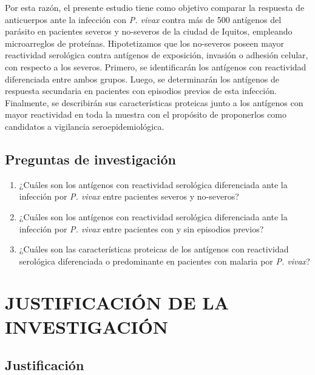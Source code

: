 \documentclass[
  a4paper]{article}
\begin{document}
Por esta razón, el presente estudio tiene como objetivo comparar la
respuesta de anticuerpos ante la infección con \emph{P. vivax} contra
más de 500 antígenos del parásito en pacientes severos y no-severos de
la ciudad de Iquitos, empleando microarreglos de proteínas.
Hipotetizamos que los no-severos poseen mayor reactividad serológica
contra antígenos de exposición, invasión o adhesión celular, con
respecto a los severos. Primero, se identificarán los antígenos con
reactividad diferenciada entre ambos grupos. Luego, se determinarán los
antígenos de respuesta secundaria en pacientes con episodios previos de
esta infección. Finalmente, se describirán sus características proteicas
junto a los antígenos con mayor reactividad en toda la muestra con el
propósito de proponerlos como candidatos a vigilancia
seroepidemiológica.

\hypertarget{preguntas-de-investigaciuxf3n}{%
\subsection{Preguntas de
investigación}\label{preguntas-de-investigaciuxf3n}}

\begin{enumerate}
\def\labelenumi{\arabic{enumi}.}
\item
  ¿Cuáles son los antígenos con reactividad serológica diferenciada ante
  la infección por \emph{P. vivax} entre pacientes severos y no-severos?
\item
  ¿Cuáles son los antígenos con reactividad serológica diferenciada ante
  la infección por \emph{P. vivax} entre pacientes con y sin episodios
  previos?
\item
  ¿Cuáles son las características proteicas de los antígenos con
  reactividad serológica diferenciada o predominante en pacientes con
  malaria por \emph{P. vivax}?
\end{enumerate}

\hypertarget{justificaciuxf3n-de-la-investigaciuxf3n}{%
\section{JUSTIFICACIÓN DE LA
INVESTIGACIÓN}\label{justificaciuxf3n-de-la-investigaciuxf3n}}

\hypertarget{justif}{%
\subsection{Justificación}\label{justif}}
\end{document}

